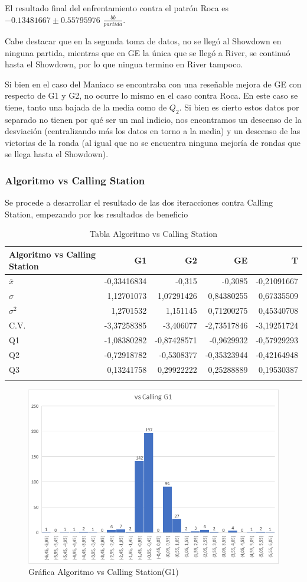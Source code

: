 El resultado final del enfrentamiento contra el patrón Roca es $-0.13481667\pm0.55795976$ $\frac{bb}{partida}$.

\vspace{5mm} %

Cabe destacar que en la segunda toma de datos, no se llegó al Showdown en ninguna partida, mientras que en GE la única que se llegó a River, se continuó hasta el Showdown, por lo que ningua termino en River tampoco.

Si bien en el caso del Maniaco se encontraba con una reseñable mejora de GE con respecto de G1 y G2, no ocurre lo mismo en el caso contra Roca. En este caso se tiene, tanto una bajada de la media como de $Q_2$. Si bien es cierto estos datos por separado no tienen por qué ser un mal indicio, nos encontramos un descenso de la desviación (centralizando más los datos en torno a la media) y un descenso de las victorias de la ronda (al igual que no se encuentra ninguna mejoría de rondas que se llega hasta el Showdown). 


\subsubsection{Algoritmo vs Calling Station}

Se procede a desarrollar el resultado de las dos iteracciones contra Calling Station, empezando por los resultados de beneficio

\begin{longtable}[c]{lrrrr}
\hline
Algoritmo vs Calling Station & G1 & G2 & GE & T \\ \hline
$\bar{x}$ & -0,33416834 & -0,315 & -0,3085 & -0,21091667 \\ 
$\sigma$ & 1,12701073 & 1,07291426 & 0,84380255 & 0,67335509 \\ 
$\sigma^2$ & 1,2701532 & 1,151145 & 0,71200275 & 0,45340708 \\ 
C.V. & -3,37258385 & -3,406077 & -2,73517846 & -3,19251724 \\ 
Q1 & -1,08380282 & -0,87428571 & -0,9629932 & -0,57929293 \\ 
Q2 & -0,72918782 & -0,5308377 & -0,35323944 & -0,42164948 \\ 
Q3 & 0,13241758 & 0,29922222 & 0,25288889 & 0,19530387 \\ \hline
\caption{Tabla Algoritmo vs Calling Station}
\label{tab:AvC}
\end{longtable}


\begin{figure}[h]
\centering
\includegraphics[width=.6\textwidth]{figuras/AvCG1.png}   
\caption{Gráfica Algoritmo vs Calling Station(G1)}
\label{fig:AvRC1}
\end{figure}

